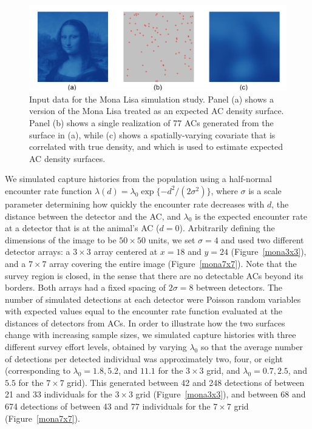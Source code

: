 \documentclass[useAMS,usenatbib,referee]{biom}
\begin{document}
\begin{figure}[htbp]
\centering
\includegraphics[width=1\textwidth]{mona_inputdata.png}
\caption{Input data for the Mona Lisa simulation study. Panel (a) shows a version of the Mona Lisa treated as an expected AC density surface. Panel (b) shows a single realization of 77 ACs generated from the surface in (a), while (c) shows a spatially-varying covariate that is correlated with true density, and which is used to estimate expected AC density surfaces.}
\label{mlinputs}
\end{figure}

We simulated capture histories from the population using a half-normal encounter rate function $\lambda(d) = \lambda_0\exp\{-d^2/(2\sigma^2)\}$, where $\sigma$ is a scale parameter determining how quickly the encounter rate decreases with $d$, the distance between the detector and the AC, and $\lambda_0$ is the expected encounter rate at a detector that is at the animal's AC ($d=0$). Arbitrarily defining the dimensions of the image to be $50\times 50$ units, we set $\sigma=4$ and used two different detector arrays: a $3\times3$ array centered at $x=18$ and $y=24$ (Figure~\ref{mona3x3}), and a $7\times 7$ array covering the entire image (Figure~\ref{mona7x7}). Note that the survey region is closed, in the sense that there are no detectable ACs beyond its borders. Both arrays had a fixed spacing of $2\sigma=8$ between detectors. The number of simulated detections at each detector were Poisson random variables with expected values equal to the encounter rate function evaluated at the distances of detectors from ACs. In order to illustrate how the two surfaces change with increasing sample sizes, we simulated capture histories with three different survey effort levels, obtained by varying $\lambda_0$ so that the average number of detections per detected individual was approximately two, four, or eight (corresponding to $\lambda_0=1.8, 5.2$, and $11.1$ for the $3\times 3$ grid, and $\lambda_0=0.7, 2.5$, and $5.5$ for the $7\times 7$ grid). This generated between 42 and 248 detections of between 21 and 33 individuals for the $3\times 3$ grid (Figure~\ref{mona3x3}), and between 68 and 674 detections of between 43 and 77 individuals for the $7\times 7$ grid (Figure~\ref{mona7x7}).
\end{document}
